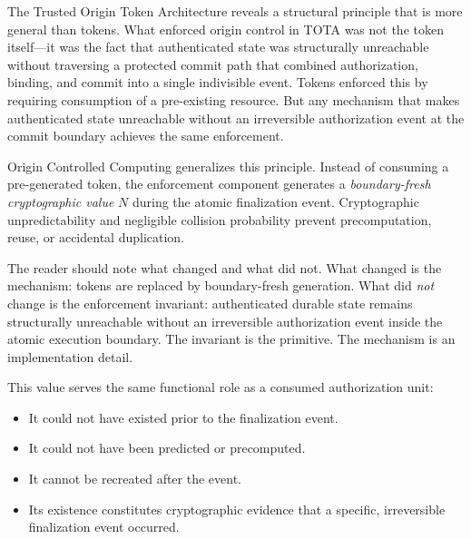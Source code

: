 \documentclass[11pt,letterpaper]{article}
\theoremstyle{occplain}
\theoremstyle{occremark}
\begin{document}
The Trusted Origin Token Architecture reveals a structural principle that is more general than tokens. What enforced origin control in TOTA was not the token itself---it was the fact that authenticated state was structurally unreachable without traversing a protected commit path that combined authorization, binding, and commit into a single indivisible event. Tokens enforced this by requiring consumption of a pre-existing resource. But any mechanism that makes authenticated state unreachable without an irreversible authorization event at the commit boundary achieves the same enforcement.

Origin Controlled Computing generalizes this principle. Instead of consuming a pre-generated token, the enforcement component generates a \emph{boundary-fresh cryptographic value} $N$ during the atomic finalization event. Cryptographic unpredictability and negligible collision probability prevent precomputation, reuse, or accidental duplication.

The reader should note what changed and what did not. What changed is the mechanism: tokens are replaced by boundary-fresh generation. What did \emph{not} change is the enforcement invariant: authenticated durable state remains structurally unreachable without an irreversible authorization event inside the atomic execution boundary. The invariant is the primitive. The mechanism is an implementation detail.

This value serves the same functional role as a consumed authorization unit:
\begin{itemize}
  \item It could not have existed prior to the finalization event.
  \item It could not have been predicted or precomputed.
  \item It cannot be recreated after the event.
  \item Its existence constitutes cryptographic evidence that a specific, irreversible finalization event occurred.
\end{itemize}
\end{document}
